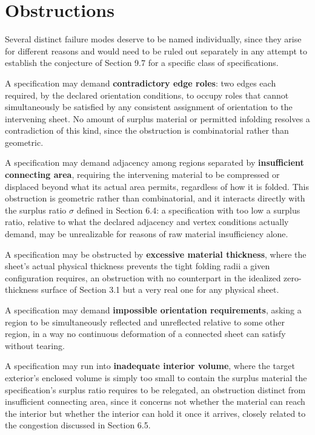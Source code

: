 \documentclass[11pt,oneside]{book}
\begin{document}
\hypertarget{obstructions}{%
\section{Obstructions}\label{obstructions}}

Several distinct failure modes deserve to be named individually, since
they arise for different reasons and would need to be ruled out
separately in any attempt to establish the conjecture of Section 9.7 for
a specific class of specifications.

A specification may demand \textbf{contradictory edge roles}: two edges
each required, by the declared orientation conditions, to occupy roles
that cannot simultaneously be satisfied by any consistent assignment of
orientation to the intervening sheet. No amount of surplus material or
permitted infolding resolves a contradiction of this kind, since the
obstruction is combinatorial rather than geometric.

A specification may demand adjacency among regions separated by
\textbf{insufficient connecting area}, requiring the intervening
material to be compressed or displaced beyond what its actual area
permits, regardless of how it is folded. This obstruction is geometric
rather than combinatorial, and it interacts directly with the surplus
ratio \(\sigma\) defined in Section 6.4: a specification with too low a
surplus ratio, relative to what the declared adjacency and vertex
conditions actually demand, may be unrealizable for reasons of raw
material insufficiency alone.

A specification may be obstructed by \textbf{excessive material
thickness}, where the sheet's actual physical thickness prevents the
tight folding radii a given configuration requires, an obstruction with
no counterpart in the idealized zero-thickness surface of Section 3.1
but a very real one for any physical sheet.

A specification may demand \textbf{impossible orientation requirements},
asking a region to be simultaneously reflected and unreflected relative
to some other region, in a way no continuous deformation of a connected
sheet can satisfy without tearing.

A specification may run into \textbf{inadequate interior volume}, where
the target exterior's enclosed volume is simply too small to contain the
surplus material the specification's surplus ratio requires to be
relegated, an obstruction distinct from insufficient connecting area,
since it concerns not whether the material can reach the interior but
whether the interior can hold it once it arrives, closely related to the
congestion discussed in Section 6.5.
\end{document}
